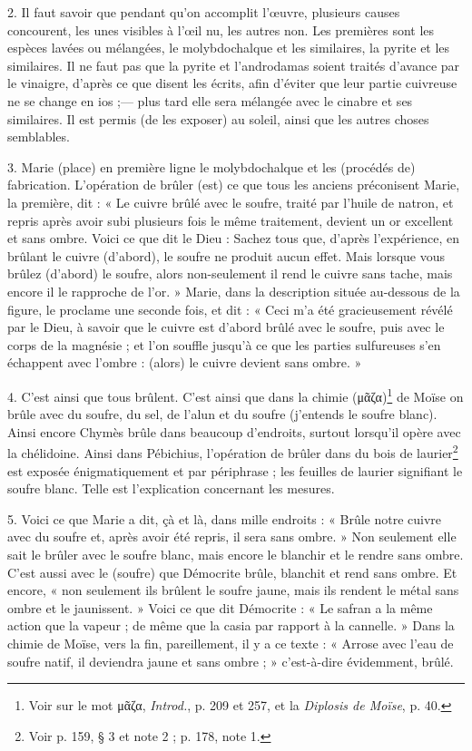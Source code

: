 \documentclass[a4paper, 11pt, oneside, polutonikogreek, french]{article}
\begin{document}
2. Il faut savoir que pendant qu'on accomplit l'œuvre, plusieurs causes concourent, les unes visibles à l'œil nu, les autres non. Les premières sont les espèces lavées ou mélangées, le molybdochalque et les similaires, la pyrite et les similaires. Il ne faut pas que la pyrite et l'androdamas soient traités d'avance par le vinaigre, d'après ce que disent les écrits, afin d'éviter que leur partie cuivreuse ne se change en ios ;--- plus tard elle sera mélangée avec le cinabre et ses similaires. Il est permis (de les exposer) au soleil, ainsi que les autres choses semblables.

3. Marie (place) en première ligne le molybdochalque et les (procédés de) fabrication. L'opération de brûler (est) ce que tous les anciens préconisent Marie, la première, dit : « Le cuivre brûlé avec le soufre, traité par l'huile de natron, et repris après avoir subi plusieurs fois le même traitement, devient un or excellent et sans ombre. Voici ce que dit le Dieu : Sachez tous que, d'après l'expérience, en brûlant le cuivre (d'abord), le soufre ne produit aucun effet. Mais lorsque vous brûlez (d'abord) le soufre, alors non-seulement il rend le cuivre sans tache, mais encore il le rapproche de l'or. » Marie, dans la description située au-dessous de la figure, le proclame une seconde fois, et dit : « Ceci m'a été gracieusement révélé par le Dieu, à savoir que le cuivre est d'abord brûlé avec le soufre, puis avec le corps de la magnésie ; et l'on souffle jusqu'à ce que les parties sulfureuses s'en échappent avec l'ombre : (alors) le cuivre devient sans ombre. »

4. C'est ainsi que tous brûlent. C'est ainsi que dans la chimie (μᾶζα)\footnote{Voir sur le mot μᾶζα, \emph{Introd.}, p. 209 et 257, et la \emph{Diplosis de Moïse}, p. 40.} de Moïse on brûle avec du soufre, du sel, de l'alun et du soufre (j'entends le soufre blanc). Ainsi encore Chymès brûle dans beaucoup d'endroits, surtout lorsqu'il opère avec la chélidoine. Ainsi dans Pébichius, l'opération de brûler dans du bois de laurier\footnote{Voir p. 159, § 3 et note 2 ; p. 178, note 1.} est exposée énigmatiquement et par périphrase ; les feuilles de laurier signifiant le soufre blanc. Telle est l'explication concernant les mesures.

5. Voici ce que Marie a dit, çà et là, dans mille endroits : « Brûle notre cuivre avec du soufre et, après avoir été repris, il sera sans ombre. » Non seulement elle sait le brûler avec le soufre blanc, mais encore le blanchir et le rendre sans ombre. C'est aussi avec le (soufre) que Démocrite brûle, blanchit et rend sans ombre. Et encore, « non seulement ils brûlent le soufre jaune, mais ils rendent le métal sans ombre et le jaunissent. » Voici ce que dit Démocrite : « Le safran a la même action que la vapeur ; de même que la casia par rapport à la cannelle. » Dans la chimie de Moïse, vers la fin, pareillement, il y a ce texte : « Arrose avec l'eau de soufre natif, il deviendra jaune et sans ombre ; » c'est-à-dire évidemment, brûlé.
\end{document}
